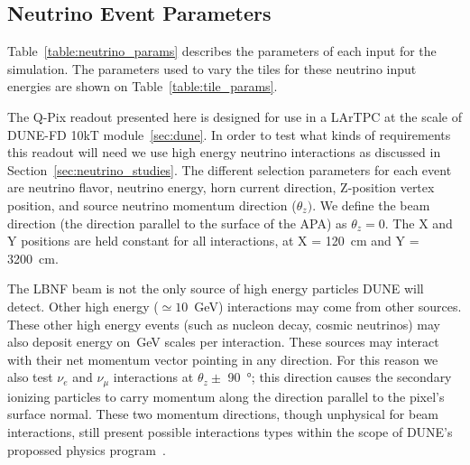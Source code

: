 \subsection{Neutrino Event Parameters}

Table~\ref{table:neutrino_params} describes the parameters of each input for the simulation.
The parameters used to vary the tiles for these neutrino input energies are shown on Table~\ref{table:tile_params}.

The Q-Pix readout presented here is designed for use in a LArTPC at the scale of DUNE-FD 10kT module~\ref{sec:dune}.
In order to test what kinds of requirements this readout will need we use high energy neutrino interactions as discussed in Section~\ref{sec:neutrino_studies}.
The different selection parameters for each event are neutrino flavor, neutrino energy, horn current direction, Z-position vertex position, and source neutrino momentum direction ($\theta_{z})$.
We define the beam direction (the direction parallel to the surface of the APA) as $\theta_{z} = 0$.
The X and Y positions are held constant for all interactions, at X = 120~\unit{cm} and Y = 3200~\unit{cm}.

The LBNF beam is not the only source of high energy particles DUNE will detect.
Other high energy ($\simeq 10$~\unit{GeV}) interactions may come from other sources.
These other high energy events (such as nucleon decay, cosmic neutrinos) may also deposit energy on~\unit{GeV} scales per interaction.
These sources may interact with their net momentum vector pointing in any direction.
For this reason we also test $\nu_{e}$ and $\nu_{\mu}$ interactions at $\theta_{z} \pm$ 90~\unit{\degree}; this direction causes the secondary ionizing particles to carry momentum along the direction parallel to the pixel's surface normal.
These two momentum directions, though unphysical for beam interactions, still present possible interactions types within the scope of DUNE's propossed physics program~\citep{DUNE_TDRv3_Abi_2020}.


